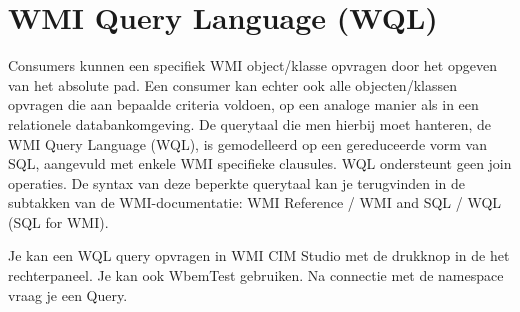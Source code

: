 \documentclass[11pt,a4paper]{report}
\begin{document}
\section{WMI Query Language (WQL)}

Consumers kunnen een specifiek WMI object/klasse opvragen door het opgeven van het absolute pad. Een consumer kan echter ook alle objecten/klassen opvragen die aan bepaalde criteria voldoen, op een analoge manier als in een relationele databankomgeving. De querytaal die men hierbij moet hanteren, de WMI Query Language (WQL), is gemodelleerd op een gereduceerde vorm van SQL, aangevuld met enkele WMI specifieke clausules. WQL ondersteunt geen join operaties. De syntax van deze beperkte querytaal kan je terugvinden in de subtakken van de WMI-documentatie: WMI Reference / WMI and SQL / WQL (SQL for WMI).
\par Je kan een WQL query opvragen in WMI CIM Studio met de drukknop in de het rechterpaneel. Je kan ook WbemTest gebruiken. Na connectie met de namespace vraag je een Query.
\end{document}
